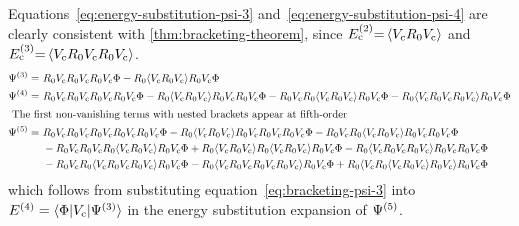 \documentclass[11pt]{article}
\numberwithin{equation}{section}
\begin{document}
\begin{ex}
Equations~\ref{eq:energy-substitution-psi-3} and~\ref{eq:energy-substitution-psi-4} are clearly consistent with \cref{thm:bracketing-theorem}, since $E_{\mathrm{c}}^{(2)}{=}\,\langle V_{\mathrm{c}}R_0V_{\mathrm{c}}\rangle$ and $E_{\mathrm{c}}^{(3)}{=}\,\langle V_{\mathrm{c}}R_0V_{\mathrm{c}}R_0V_{\mathrm{c}}\rangle$.
\begin{align}
\label{eq:bracketing-psi-3}
  \Psi ^{(3)}
=&\
  R_0V_{\mathrm{c}}R_0V_{\mathrm{c}}R_0V_{\mathrm{c}}\Phi 
-
  R_0\langle V_{\mathrm{c}}R_0V_{\mathrm{c}}\rangle R_0V_{\mathrm{c}}\Phi 
\\
  \Psi ^{(4)}
=&\
  R_0V_{\mathrm{c}}R_0V_{\mathrm{c}}R_0V_{\mathrm{c}}R_0V_{\mathrm{c}}\Phi 
-
  R_0\langle V_{\mathrm{c}}R_0V_{\mathrm{c}}\rangle R_0V_{\mathrm{c}}R_0V_{\mathrm{c}}\Phi 
-
  R_0V_{\mathrm{c}}R_0\langle V_{\mathrm{c}}R_0V_{\mathrm{c}}\rangle R_0V_{\mathrm{c}}\Phi 
-
  R_0\langle V_{\mathrm{c}}R_0V_{\mathrm{c}}R_0V_{\mathrm{c}}\rangle R_0V_{\mathrm{c}}\Phi 
\\
\intertext{
The first non-vanishing terms with nested brackets appear at fifth-order
}
\nonumber
  \Psi ^{(5)}
=&\
  R_0V_{\mathrm{c}}R_0V_{\mathrm{c}}R_0V_{\mathrm{c}}R_0V_{\mathrm{c}}R_0V_{\mathrm{c}}\Phi 
-
  R_0\langle V_{\mathrm{c}}R_0V_{\mathrm{c}}\rangle R_0V_{\mathrm{c}}R_0V_{\mathrm{c}}R_0V_{\mathrm{c}}\Phi 
-
  R_0V_{\mathrm{c}}R_0\langle V_{\mathrm{c}}R_0V_{\mathrm{c}}\rangle R_0V_{\mathrm{c}}R_0V_{\mathrm{c}}\Phi 
\\&\
\nonumber
-
  R_0V_{\mathrm{c}}R_0V_{\mathrm{c}}R_0\langle V_{\mathrm{c}}R_0V_{\mathrm{c}}\rangle R_0V_{\mathrm{c}}\Phi 
+
  R_0\langle V_{\mathrm{c}}R_0V_{\mathrm{c}}\rangle R_0\langle V_{\mathrm{c}}R_0V_{\mathrm{c}}\rangle R_0V_{\mathrm{c}}\Phi 
-
  R_0\langle V_{\mathrm{c}}R_0V_{\mathrm{c}}R_0V_{\mathrm{c}}\rangle R_0V_{\mathrm{c}}R_0V_{\mathrm{c}}\Phi 
\\&\
-
  R_0V_{\mathrm{c}}R_0\langle V_{\mathrm{c}}R_0V_{\mathrm{c}}R_0V_{\mathrm{c}}\rangle R_0V_{\mathrm{c}}\Phi 
-
  R_0\langle V_{\mathrm{c}}R_0V_{\mathrm{c}}R_0V_{\mathrm{c}}R_0V_{\mathrm{c}}\rangle R_0V_{\mathrm{c}}\Phi 
+
  R_0\langle V_{\mathrm{c}}R_0\langle V_{\mathrm{c}}R_0V_{\mathrm{c}}\rangle R_0V_{\mathrm{c}}\rangle R_0V_{\mathrm{c}}\Phi 
\end{align}
which follows from substituting equation~\ref{eq:bracketing-psi-3} into $E^{(4)}=\langle\Phi |V_{\mathrm{c}}|\Psi ^{(3)}\rangle$ in the energy substitution expansion of $\Psi ^{(5)}$.
\end{ex}
\end{document}
